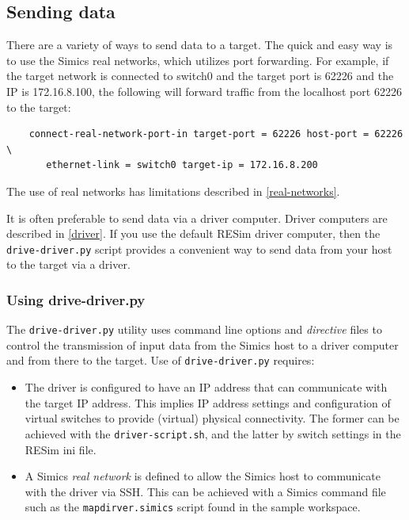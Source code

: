 \documentclass[titlepage]{article}
\begin{document}
\subsection{Sending data}
\label{sending-data}
There are a variety of ways to send data to a target.  The quick and easy way is to use the Simics real networks, which utilizes
port forwarding.  For example, if the target network is connected to switch0 and the target port is 62226 and the IP is
172.16.8.100, the following will forward traffic from the localhost port 62226 to the target: 
\begin{verbatim}
    connect-real-network-port-in target-port = 62226 host-port = 62226 \
       ethernet-link = switch0 target-ip = 172.16.8.200
\end{verbatim}
The use of real networks has limitations described in \ref{real-networks}.

It is often preferable to send data via a driver computer. Driver computers are described in \ref{driver}.  If you use the default RESim driver computer, then the
{\tt drive-driver.py} script provides a convenient way to send data from your host to the target via a driver.

\subsubsection{Using drive-driver.py}
\label{drive-driver}
The {\tt drive-driver.py} utility uses command line options and \textit{directive} files to control the transmission of input 
data from the Simics host to a driver computer and from there to the target.  Use of {\tt drive-driver.py} requires:
\begin{itemize}
\item The driver is configured to have an IP address that can communicate with the target IP address.  This implies IP address settings and configuration
of virtual switches to provide (virtual) physical connectivity.  The former can be achieved with the {\tt driver-script.sh}, and the latter by switch settings
in the RESim ini file.
\item A Simics \textit{real network} is defined to allow the Simics host to communicate with the driver via SSH.  This can be achieved with a 
Simics command file such as the {\tt mapdirver.simics} script found in the sample workspace.
\end{itemize}
\end{document}
